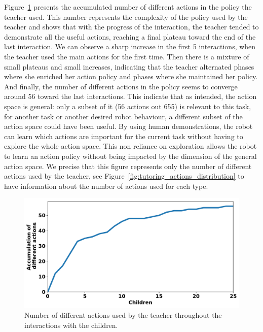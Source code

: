Figure~\ref{fig:tutoring_actions} presents the accumulated number of different actions in the policy the teacher used. This number represents the complexity of the policy used by the teacher and shows that with the progress of the interaction, the teacher tended to demonstrate all the useful actions, reaching a final plateau toward the end of the last interaction. We can observe a sharp increase in the first 5 interactions, when the teacher used the main actions for the first time. Then there is a mixture of small plateaus and small increases, indicating that the teacher alternated phases where she enriched her action policy and phases where she maintained her policy. And finally, the number of different actions in the policy seems to converge around 56 toward the last interactions. This indicate that as intended, the action space is general: only a subset of it (56 actions out 655) is relevant to this task, for another task or another desired robot behaviour, a different subset of the action space could have been useful. By using human demonstrations, the robot can learn which actions are important for the current task without having to explore the whole action space. This non reliance on exploration allows the robot to learn an action policy without being impacted by the dimension of the general action space. We precise that this figure represents only the number of different actions used by the teacher, see Figure~\ref{fig:tutoring_actions_distribution} to have information about the number of actions used for each type.

\begin{figure}[ht]
	\includegraphics[width=.85\linewidth]{./number_actions.pdf}
	\centering
	\caption{Number of different actions used by the teacher throughout the interactions with the children.}
	\label{fig:tutoring_actions}
\end{figure}


